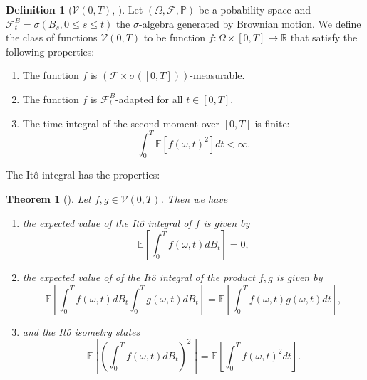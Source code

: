 \documentclass[12pt]{article}
\newtheorem{theorem}{Theorem}[section]
\theoremstyle{definition}
\newtheorem{definition}[definition]{Definition}
\numberwithin{equation}{section}
\newcommand{\R}{\mathbb{R}}
\newcommand{\BP}{\mathbb{P}}
\newcommand{\CF}{\mathcal{F}}
\newcommand{\CV}{\mathcal{V}}
\newcommand{\ev}[1]{\mathbb{E}\left[{#1}\right]}
\begin{document}
\begin{definition}[$\CV(0,T)$, ]
  Let $(\Omega, \CF, \BP)$ be a pobability space and $\CF_t^B = \sigma(B_s, 0 \leq s \leq t)$ the $\sigma$-algebra generated by Brownian motion. We define the class of functions $\CV(0,T)$ to be function $f :\Omega \times [0,T] \rightarrow \R$ that satisfy the following properties:
  \begin{enumerate}[label=(\roman*)]
    \item The function $f$ is $(\CF \times \sigma([0,T]))$-measurable.
    \item The function $f$ is $\CF_t^B$-adapted for all $t \in [0,T]$.
    \item The time integral of the second moment over $[0,T]$ is finite:
    \begin{equation*}
      \int_0^T \ev{f(\omega,t)^2}dt< \infty.
    \end{equation*}
  \end{enumerate}
\end{definition}
The Itô integral has the properties:
\begin{theorem}[\autocite{eAppliedStochasticAnalysis2021}]
  \label{thm:ito_isometry}
  Let $f,g \in \CV(0,T)$. Then we have
  \begin{enumerate}[label=(\roman*)]
    \item \label{item:zero_integral} the expected value of the Itô integral of $f$ is given by
    \begin{equation}
    \label{eq:ito_integral_ev}
    \ev{\int_0^T f(\omega,t)dB_t} = 0,
    \end{equation}
    \item the expected value of of the Itô integral of the product $f,g$ is given by
    \begin{equation}
      \label{eq:ito_product}
      \ev{\int_0^T f(\omega,t)dB_t\int_0^T g(\omega,t)dB_t } = \ev{\int_0^T f(\omega,t)g(\omega, t)dt },
    \end{equation}
    \item and the Itô isometry states
    \begin{equation}
      \label{eq:ito_isometry}
      \ev{\left(\int_0^T f(\omega,t)dB_t\right)^2 } = \ev{\int_0^T f(\omega,t)^2dt }.
    \end{equation}
  \end{enumerate}
\end{theorem}
\end{document}
